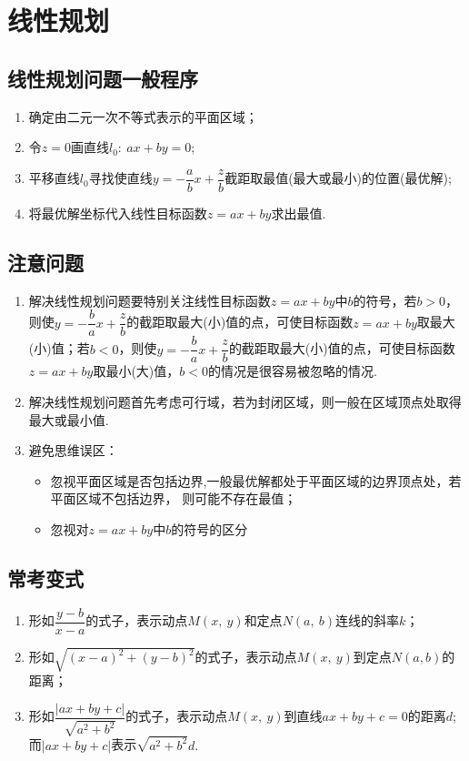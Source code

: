 \documentclass{BHCexam}
\begin{document}
\newpage
\section{线性规划}
\subsection{线性规划问题一般程序}
\begin{enumerate}[1)]
\item 确定由二元一次不等式表示的平面区域；
\item 令$ z=0 $画直线$l_0:~ax+by=0  $;
\item 平移直线$ l_0 $寻找使直线$ y=-\dfrac{a}{b}x+\dfrac{z}{b} $截距取最值(最大或最小)的位置(最优解);
\item 将最优解坐标代入线性目标函数$ z=ax+by $求出最值.
\end{enumerate}
\subsection{注意问题}
\begin{enumerate}[1)]
\item 解决线性规划问题要特别关注线性目标函数$ z=ax+by $中$ b $的符号，若$ b>0 $，则使$ y=-\dfrac{b}{a}x+\dfrac{z}{b} $的截距取最大(小)值的点，可使目标函数$ z=ax+by $取最大(小)值；若$b<0$，则使$ y=-\dfrac{b}{a}x+\dfrac{z}{b} $的截距取最大(小)值的点，可使目标函数$ z=ax+by $取最小(大)值，$ b<0 $的情况是很容易被忽略的情况.
\item 解决线性规划问题首先考虑可行域，若为封闭区域，则一般在区域顶点处取得最大或最小值.
\item 避免思维误区：\begin{itemize}
\item 忽视平面区域是否包括边界,一般最优解都处于平面区域的边界顶点处，若平面区域不包括边界， 则可能不存在最值；
\item 忽视对$ z=ax+by $中$ b $的符号的区分
\end{itemize}
\end{enumerate}
\subsection{常考变式}

\begin{enumerate}[1)]
\item 形如$ \dfrac{y-b}{x-a} $的式子，表示动点$ M(x,~y) $和定点$ N(a,~b) $连线的斜率$ k $；
\item 形如$ \sqrt{(x-a)^2+(y-b)^2} $的式子，表示动点$ M(x,~y) $到定点$ N(a,b) $的距离；
\item 形如$ \dfrac{\left|ax+by+c\right|}{\sqrt{a^2+b^2}} $的式子，表示动点$ M(x,~y) $到直线$ ax+by+c=0 $的距离$ d $;而$ \left|ax+by+c\right| $表示$ \sqrt{a^2+b^2}d .$
\end{enumerate}
\end{document}
